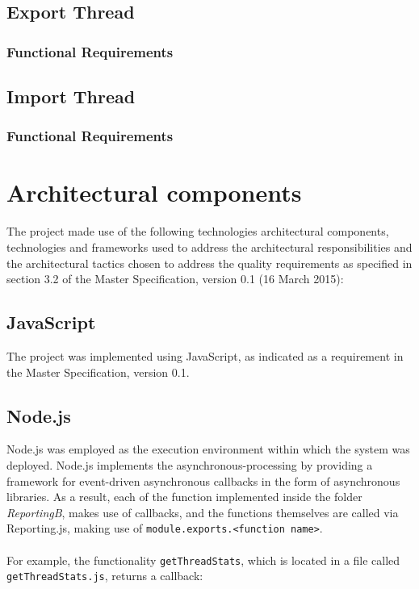 \documentclass[a4paper]{article}
\begin{document}
\subsection {Export Thread} 

\subsubsection {Functional Requirements} 

\subsection {Import Thread} 

\subsubsection {Functional Requirements} 

\section{Architectural components}

The project made use of the following technologies architectural components, technologies and frameworks used to address the architectural responsibilities and the architectural tactics chosen to address the quality requirements as specified in section 3.2 of the Master Specification, version 0.1 (16 March 2015):

\subsection {JavaScript} The project was implemented using JavaScript, as indicated as a requirement in the Master Specification, version 0.1. 
\subsection {Node.js} Node.js was employed as the execution environment within which the system was deployed. Node.js implements the asynchronous-processing by providing a framework for event-driven asynchronous callbacks in the form of asynchronous libraries. As a result, each of the function implemented inside the folder \textit{ReportingB}, makes use of callbacks, and the functions themselves are called via Reporting.js, making use of \texttt{module.exports.<function name>}. 
\\ 
\\ For example, the functionality \texttt{getThreadStats}, which is located in a file called \\ \texttt{getThreadStats.js}, returns a callback:
\\
\end{document}
